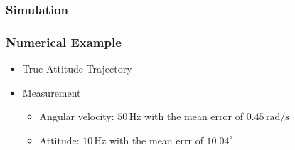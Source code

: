 \subsubsection[Simulation]{Simulation}
\begin{frame}
\frametitle{Numerical Example}

\begin{itemize}
\item True Attitude Trajectory
    \begin{center}
\end{center}
\pause
\item Measurement
	\begin{itemize}
	\item Angular velocity: $50\,\mathrm{Hz}$ with the mean error of $0.45\,\mathrm{rad/s}$
	\item Attitude: $10\,\mathrm{Hz}$ with the mean errr of $10.04^\circ$
	\end{itemize}
\end{itemize}


\end{frame}


